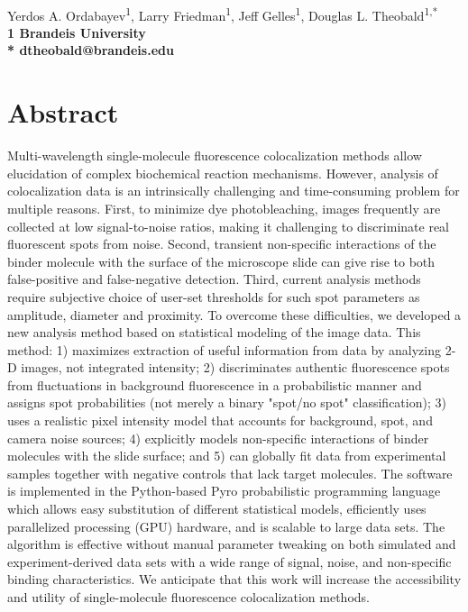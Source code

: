 \documentclass[10pt,letterpaper]{article}
\begin{document}
\vspace*{0.35in}

\begin{flushleft}
{\Large
\textbf{}
}
\newline
\\
Yerdos A. Ordabayev\textsuperscript{1},
Larry Friedman\textsuperscript{1},
Jeff Gelles\textsuperscript{1},
Douglas L. Theobald\textsuperscript{1,*}
\\
\bigskip
\bf{1} Brandeis University
\\
\bigskip
* dtheobald@brandeis.edu

\end{flushleft}

\section*{Abstract}
Multi-wavelength single-molecule fluorescence colocalization methods allow elucidation of complex biochemical reaction mechanisms. However, analysis of colocalization data is an intrinsically challenging and time-consuming problem for multiple reasons. First, to minimize dye photobleaching, images frequently are collected at low signal-to-noise ratios, making it challenging to discriminate real fluorescent spots from noise. Second, transient non-specific interactions of the binder molecule with the surface of the microscope slide can give rise to both false-positive and false-negative detection. Third, current analysis methods require subjective choice of user-set thresholds for such spot parameters as amplitude, diameter and proximity. To overcome these difficulties, we developed a new analysis method based on statistical modeling of the image data. This method: 1) maximizes extraction of useful information from data by analyzing 2-D images, not integrated intensity; 2) discriminates authentic fluorescence spots from fluctuations in background fluorescence in a probabilistic manner and assigns spot probabilities (not merely a binary "spot/no spot" classification); 3) uses a realistic pixel intensity model that accounts for background, spot, and camera noise sources; 4) explicitly models non-specific interactions of binder molecules with the slide surface; and 5) can globally fit data from experimental samples together with negative controls that lack target molecules. The software is implemented in the Python-based Pyro probabilistic programming language which allows easy substitution of different statistical models, efficiently uses parallelized processing (GPU) hardware, and is scalable to large data sets. The algorithm is effective without manual parameter tweaking on both simulated and experiment-derived data sets with a wide range of signal, noise, and non-specific binding characteristics. We anticipate that this work will increase the accessibility and utility of single-molecule fluorescence colocalization methods.
\end{document}

